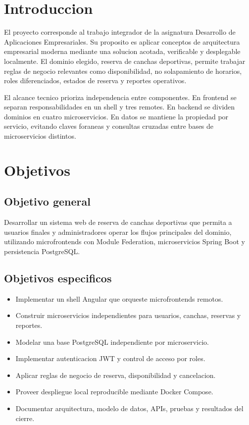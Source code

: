 \documentclass[12pt,a4paper]{article}
\begin{document}
\section{Introduccion}

El proyecto corresponde al trabajo integrador de la asignatura Desarrollo de Aplicaciones Empresariales. Su proposito es aplicar conceptos de arquitectura empresarial moderna mediante una solucion acotada, verificable y desplegable localmente. El dominio elegido, reserva de canchas deportivas, permite trabajar reglas de negocio relevantes como disponibilidad, no solapamiento de horarios, roles diferenciados, estados de reserva y reportes operativos.

El alcance tecnico prioriza independencia entre componentes. En frontend se separan responsabilidades en un shell y tres remotes. En backend se dividen dominios en cuatro microservicios. En datos se mantiene la propiedad por servicio, evitando claves foraneas y consultas cruzadas entre bases de microservicios distintos.

\section{Objetivos}

\subsection{Objetivo general}

Desarrollar un sistema web de reserva de canchas deportivas que permita a usuarios finales y administradores operar los flujos principales del dominio, utilizando microfrontends con Module Federation, microservicios Spring Boot y persistencia PostgreSQL.

\subsection{Objetivos especificos}

\begin{itemize}
  \item Implementar un shell Angular que orqueste microfrontends remotos.
  \item Construir microservicios independientes para usuarios, canchas, reservas y reportes.
  \item Modelar una base PostgreSQL independiente por microservicio.
  \item Implementar autenticacion JWT y control de acceso por roles.
  \item Aplicar reglas de negocio de reserva, disponibilidad y cancelacion.
  \item Proveer despliegue local reproducible mediante Docker Compose.
  \item Documentar arquitectura, modelo de datos, APIs, pruebas y resultados del cierre.
\end{itemize}
\end{document}
